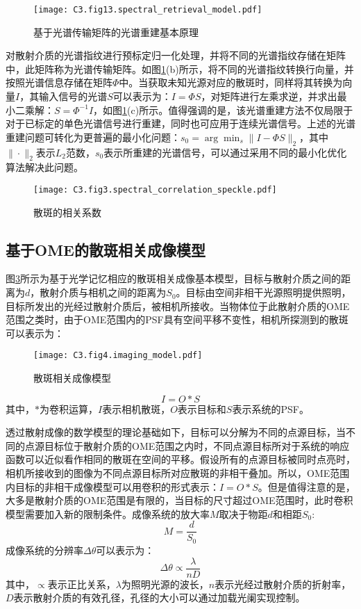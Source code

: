 \begin{figure}[htp]
	\centering
	\texttt{[image: C3.fig13.spectral\_retrieval\_model.pdf]}
	\caption{基于光谱传输矩阵的光谱重建基本原理}
	\label{fig:3.2}
\end{figure}

对散射介质的光谱指纹进行预标定归一化处理，并将不同的光谱指纹存储在矩阵中，此矩阵称为光谱传输矩阵。如图\ref{fig:3.2}(b)所示，将不同的光谱指纹转换行向量，并按照光谱信息存储在矩阵$\Phi$中。当获取未知光源对应的散斑时，同样将其转换为向量$I$，其输入信号的光谱$S$可以表示为：$I={\Phi}S$，对矩阵进行左乘求逆，并求出最小二乘解：$S={\Phi}^{-1}I$，如图\ref{fig:3.2}(c)所示。值得强调的是，该光谱重建方法不仅局限于对于已标定的单色光谱信号进行重建，同时也可应用于连续光谱信号。上述的光谱重建问题可转化为更普遍的最小化问题：$s_{0}=\arg{\min_s \| I -{\Phi}S \|_2}$，其中$\| \cdot \|_2$表示$L_2$范数，$s_{0}$表示所重建的光谱信号，可以通过采用不同的最小化优化算法解决此问题。
\begin{figure}[htp]
	\centering
	\texttt{[image: C3.fig3.spectral\_correlation\_speckle.pdf]}
	\caption{散斑的相关系数}
	\label{fig:3.3}
\end{figure}
\subsection{基于OME的散斑相关成像模型}
图\ref{fig:3.4}所示为基于光学记忆相应的散斑相关成像基本模型，目标与散射介质之间的距离为$d$，散射介质与相机之间的距离为$S_{0}$。目标由空间非相干光源照明提供照明，目标所发出的光经过散射介质后，被相机所接收。当物体位于此散射介质的OME范围之类时，由于OME范围内的PSF具有空间平移不变性，相机所探测到的散斑可以表示为：
\begin{figure}[htp]
	\centering
	\texttt{[image: C3.fig4.imaging\_model.pdf]}
	\caption{散斑相关成像模型}
	\label{fig:3.4}
\end{figure}

\begin{equation}
    I = O*S
\label{eq:speckle_autocorrelation_imgaing}
\end{equation}其中，$*$为卷积运算，$I$表示相机散斑，$O$表示目标和$S$表示系统的PSF。

透过散射成像的数学模型的理论基础如下，目标可以分解为不同的点源目标，当不同的点源目标位于散射介质的OME范围之内时，不同点源目标所对于系统的响应函数可以近似看作相同的散斑在空间的平移。假设所有的点源目标被同时点亮时，相机所接收到的图像为不同点源目标所对应散斑的非相干叠加。所以，OME范围内目标的非相干成像模型可以用卷积的形式表示：$I = O*S$。但是值得注意的是，大多是散射介质的OME范围是有限的，当目标的尺寸超过OME范围时，此时卷积模型需要加入新的限制条件。成像系统的放大率$M$取决于物距$d$和相距$S_{0}$:
\begin{equation}
    M = \frac{d}{S_{0}}
\label{eq:magnification_imgaing_system}
\end{equation}
成像系统的分辨率$\Delta \theta $可以表示为：
\begin{equation}
    \Delta \theta   \propto \frac{\lambda}{nD}
\label{eq:angleresolution_imgaing_system}
\end{equation}
其中，$\propto$表示正比关系，$\lambda$为照明光源的波长，$n$表示光经过散射介质的折射率，$D$表示散射介质的有效孔径，孔径的大小可以通过加载光阑实现控制。


